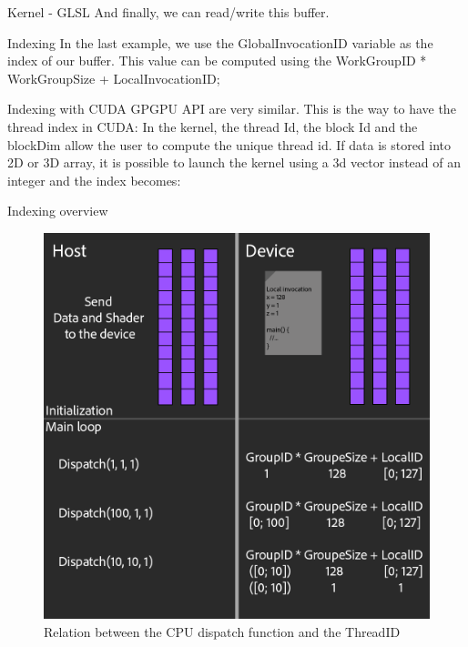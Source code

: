 \documentclass{beamer}
\begin{document}
\begin{frame}{Kernel - GLSL}
	And finally, we can read/write this buffer.
	\codeKernelBufferWrite
\end{frame}



\begin{frame}{Indexing}
	In the last example, we use the GlobalInvocationID variable as the index of our buffer. This value can be computed using the WorkGroupID * WorkGroupSize + LocalInvocationID;
\end{frame}

\begin{frame}{Indexing with CUDA}
	GPGPU API are very similar. This is the way to have the thread index in CUDA:
	In the kernel, the thread Id, the block Id and the blockDim allow the user to compute the unique thread id.
	\codeIndex
	If data is stored into 2D or 3D array, it is possible to launch the kernel using a 3d vector instead of an integer and the index becomes:
	\codeIndexDim
\end{frame}

\begin{frame}{Indexing overview}
	\begin{figure}
		\includegraphics[scale=0.2]{figures/threadID.png}
		\caption{Relation between the CPU dispatch function and the ThreadID}
	\end{figure}
\end{frame}
\end{document}
